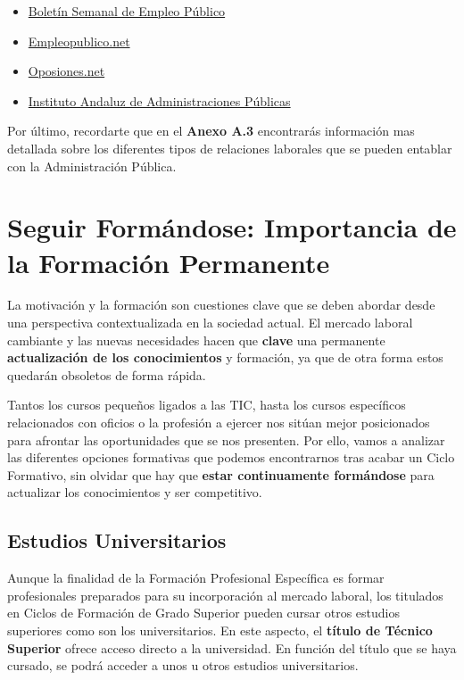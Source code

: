 \begin{itemize}
    \item \href{https://administracion.gob.es/pag_Home/empleoPublico/boletin.html}{Boletín Semanal de Empleo Público}
    \item \href{https://www.empleopublico.net/}{Empleopublico.net}
    \item \href{https://www.oposiciones.net/}{Oposiones.net}
    \item \href{https://www.juntadeandalucia.es/institutodeadministracionpublica/institutodeadministracionpublica/publico/home.filter?idsitio=15}{Instituto Andaluz de Administraciones Públicas}
\end{itemize}

Por último, recordarte que en el \textbf{Anexo A.3} encontrarás información mas detallada sobre los diferentes tipos de relaciones laborales que se pueden entablar con la Administración Pública.

\section{Seguir Formándose: Importancia de la Formación Permanente}
La motivación y la formación son cuestiones clave que se deben abordar desde una perspectiva contextualizada en la sociedad actual. El mercado laboral cambiante y las nuevas necesidades hacen que \textbf{clave} una permanente \textbf{actualización de los conocimientos} y formación, ya que de otra forma estos quedarán obsoletos de forma rápida.

Tantos los cursos pequeños ligados a las TIC, hasta los cursos específicos relacionados con oficios o la profesión a ejercer nos sitúan mejor posicionados para afrontar las oportunidades que se nos presenten. Por ello, vamos a analizar las diferentes opciones formativas que podemos encontrarnos tras acabar un Ciclo Formativo, sin olvidar que hay que \textbf{estar continuamente formándose} para actualizar los conocimientos y ser competitivo.

\subsection{Estudios Universitarios}
Aunque la finalidad de la Formación Profesional Específica es formar profesionales preparados para su incorporación al mercado laboral, los titulados en Ciclos de Formación de Grado Superior pueden cursar otros estudios superiores como son los universitarios. En este aspecto, el \textbf{título de Técnico Superior} ofrece acceso directo a la universidad. En función del título que se haya cursado, se podrá acceder a unos u otros estudios universitarios.

